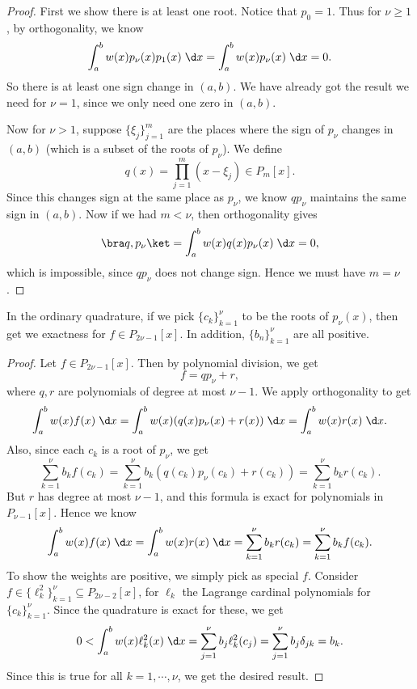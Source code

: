 \documentclass[a4paper]{article}
\begin{document}
\begin{proof}
  First we show there is at least one root. Notice that $p_0 = 1$. Thus for $\nu \geq 1$, by orthogonality, we know
  \[
    \int_a^b w(x) p_\nu(x) p_1(x)\;\d x = \int_a^b w(x) p_\nu(x)\;\d x = 0.
  \]
  So there is at least one sign change in $(a, b)$. We have already got the result we need for $\nu = 1$, since we only need one zero in $(a, b)$.

  Now for $\nu > 1$, suppose $\{\xi_j\}_{j = 1}^m$ are the places where the sign of $p_\nu$ changes in $(a, b)$ (which is a subset of the roots of $p_\nu$). We define
  \[
    q(x) = \prod_{j = 1}^m (x - \xi_j) \in P_m[x].
  \]
  Since this changes sign at the same place as $p_\nu$, we know $q p_\nu$ maintains the same sign in $(a, b)$. Now if we had $m < \nu$, then orthogonality gives
  \[
    \bra q, p_\nu\ket = \int_a^b w(x)q(x) p_\nu(x)\;\d x = 0,
  \]
  which is impossible, since $qp_\nu$ does not change sign. Hence we must have $m = \nu$.
\end{proof}

\begin{thm}
  In the ordinary quadrature, if we pick $\{c_k\}_{k = 1}^\nu$ to be the roots of $p_\nu(x)$, then get we exactness for $f \in P_{2\nu - 1}[x]$. In addition, $\{b_n\}_{k = 1}^\nu$ are all positive.
\end{thm}

\begin{proof}
  Let $f \in P_{2 \nu - 1}[x]$. Then by polynomial division, we get
  \[
    f = qp_\nu + r,
  \]
  where $q, r$ are polynomials of degree at most $\nu - 1$. We apply orthogonality to get
  \[
    \int_a^b w(x) f(x)\;\d x = \int_a^b w(x) (q(x) p_\nu(x) + r(x)) \;\d x= \int_a^b w(x) r(x)\;\d x.
  \]
  Also, since each $c_k$ is a root of $p_\nu$, we get
  \[
    \sum_{k = 1}^\nu b_k f(c_k) = \sum_{k = 1}^\nu b_k (q(c_k) p_\nu(c_k) + r(c_k)) = \sum_{k = 1}^\nu b_k r(c_k).
  \]
  But $r$ has degree at most $\nu - 1$, and this formula is exact for polynomials in $P_{\nu - 1}[x]$. Hence we know
  \[
    \int_a^b w(x) f(x)\;\d x = \int_a^b w(x) r(x)\;\d x = \sum_{k = 1}^\nu b_k r(c_k) = \sum_{k = 1}^\nu b_k f(c_k).
  \]
  To show the weights are positive, we simply pick as special $f$. Consider $f \in \{\ell_k^2\}_{k = 1}^\nu \subseteq P_{2\nu - 2}[x]$, for $\ell_k$ the Lagrange cardinal polynomials for $\{c_k\}_{k = 1}^\nu$. Since the quadrature is exact for these, we get
  \[
    0 < \int_a^b w(x)\ell_k^2(x)\;\d x = \sum_{j = 1}^\nu b_j \ell_k^2(c_j) = \sum_{j = 1}^\nu b_j \delta_{jk} = b_k.
  \]
  Since this is true for all $k = 1, \cdots, \nu$, we get the desired result.
\end{proof}
\end{document}
